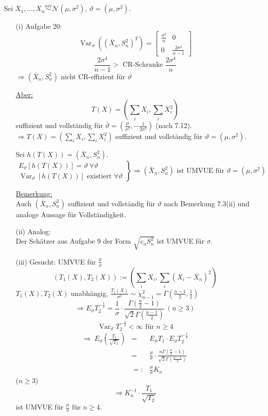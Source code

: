 \documentclass[a4paper,11pt,twoside,titlepage]{article}
\newcommand\NN{ \mathcal{N} } %
\newcommand{\uiv}{\ensuremath{\stackrel{uiv}{\sim}}}
\DeclareMathOperator{\var}{Var}
\begin{document}
Sei $X_1,\ldots,X_n\uiv\NN(\mu,\sigma^2)$, $\vartheta=(\mu,\sigma^2)$.
\begin{itemize}
\item[(i)] Aufgabe 20:
\[\var_\vartheta((\bar X_n,S_n^2)^T)=\left[\begin{array}{cc}\frac{\sigma^2}{n}&0\\0&\frac{2\sigma^4}{n-1}\end{array}\right]\]
\[\frac{2\sigma^4}{n-1}>\mbox{ CR-Schranke }\frac{2\sigma^4}{n}\]
$\Rightarrow (\bar X_n,S_n^2)$ nicht CR-effizient für $\vartheta$

\underline{Aber:}
\[T(X)=(\sum_i X_i,\sum_iX_i^2)\]
suffizient und vollständig für $\bar\vartheta=(\frac{\mu}{\sigma^2},-\frac{1}{2\sigma^2})$ (nach 7.12).\\
$\Rightarrow T(X)=(\sum_i X_i,\sum_iX_i^2)$ suffizient und vollständig für $\vartheta=(\mu,\sigma^2)$.

Sei $h(T(X))=(\bar X_n,S_n^2)$.
\[\left.\begin{array}{l}E_\vartheta[h(T(X))]=\vartheta\ \forall\vartheta\\\var_\vartheta[h(T(X))]\mbox{ existiert }\forall\vartheta\end{array}\right\}\Rightarrow (\bar X_n,S_n^2)\mbox{ ist UMVUE für }\vartheta=(\mu,\sigma^2)\]

\underline{Bemerkung:}\\
Auch $(\bar X_n,S_n^2)$ suffizient und vollständig für $\vartheta$ nach Bemerkung 7.3(ii) und analoge Aussage für Vollständigkeit.
\item[(ii)] Analog:\\
Der Schätzer aus Aufgabe 9 der Form $\sqrt{c_nS_n^2}$ ist UMVUE für $\sigma$.
\item[(iii)] Gesucht: UMVUE für $\frac{\mu}{\sigma}$
\[(T_1(X),T_2(X)):=(\sum_i X_i,\sum_i(X_i-\bar X_n)^2)\]
$T_1(X), T_2(X)$ unabhängig, $\frac{T_1(X)}{\sigma^2}\sim\chi^2_{n-1}=\Gamma(\frac{n-1}{2},\frac12)$
\[\Rightarrow E_\vartheta T_2^{-\frac12}=\frac{1}{\sigma}\cdot\frac{\Gamma(\frac n2-1)}{\sqrt{2}\Gamma(\frac{n-1}{2})}\ (n\geq3)\]
\[\var_\vartheta T_2^{-\frac12}<\infty\mbox{ für }n\geq4\]
\begin{eqnarray*}
\Rightarrow\ E_\vartheta(\frac{T_1}{\sqrt{T_2}})&=&E_\vartheta T_1\cdot E_\vartheta T_2^{-\frac12}\\
&=&\frac{\mu}{\sigma}\cdot\frac{n\Gamma(\frac n2-1)}{\sqrt{2}\Gamma(\frac{n-1}{2})}\\
&=:&\frac{\mu}{\sigma}K_n\end{eqnarray*}
($n\geq3$)
\[\Rightarrow K_n^{-1}\cdot\frac{T_1}{\sqrt{T_2}}\]
ist UMVUE für $\frac{\mu}{\sigma}$ für $n\geq4$.
\end{itemize}
\end{document}
